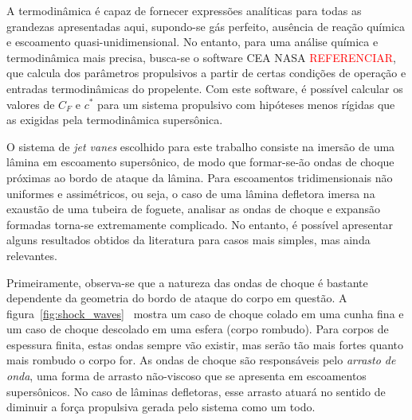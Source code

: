 A termodinâmica é capaz de fornecer expressões analíticas para todas as grandezas apresentadas aqui, supondo-se gás perfeito, ausência de reação química e escoamento quasi-unidimensional. No entanto, para uma análise química e termodinâmica mais precisa, busca-se o software CEA NASA \textcolor{red}{REFERENCIAR}, que calcula dos parâmetros propulsivos a partir de certas condições de operação e entradas termodinâmicas do propelente. Com este software, é possível calcular os valores de \(C_F\) e \(c^*\) para um sistema propulsivo com hipóteses menos rígidas que as exigidas pela termodinâmica supersônica. 

O sistema de \textit{jet vanes} escolhido para este trabalho consiste na imersão de uma lâmina em escoamento supersônico, de modo que formar-se-ão ondas de choque próximas ao bordo de ataque da lâmina. Para escoamentos tridimensionais não uniformes e assimétricos, ou seja, o caso de uma lâmina defletora imersa na exaustão de uma tubeira de foguete, analisar as ondas de choque e expansão formadas torna-se extremamente complicado. No entanto, é possível apresentar alguns resultados obtidos da literatura para casos mais simples, mas ainda relevantes. 

Primeiramente, observa-se que a natureza das ondas de choque é bastante dependente da geometria do bordo de ataque do corpo em questão. A figura~\ref{fig:shock_waves}~\cite{vandyke} mostra um caso de choque colado em uma cunha fina e um caso de choque descolado em uma esfera (corpo rombudo). Para corpos de espessura finita, estas ondas sempre vão existir, mas serão tão mais fortes quanto mais rombudo o corpo for. As ondas de choque são responsáveis pelo \textit{arrasto de onda}, uma forma de arrasto não-viscoso que se apresenta em escoamentos supersônicos. No caso de lâminas defletoras, esse arrasto atuará no sentido de diminuir a força propulsiva gerada pelo sistema como um todo.

